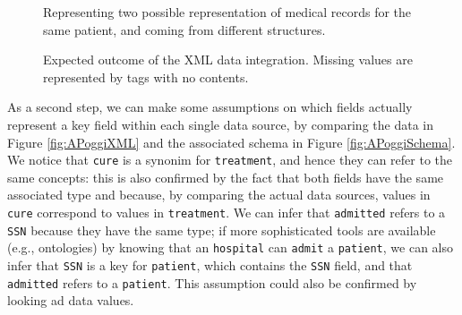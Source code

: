 \begin{figure}[!p]
	\begin{minipage}[t]{\textwidth}
		
		\label{fig:ManolescuXML}
	\end{minipage}
	
	\begin{minipage}[t]{\textwidth}
		
		\label{fig:APoggiXML}
	\end{minipage}
	
	\caption{Representing two possible representation of medical records for the same patient, and coming from different structures.}
	\label{fig:XMLIntegration}
\end{figure}
\begin{figure}[!p]
	
	\caption{Expected outcome of the XML data integration. Missing values are represented by tags with no contents.}
	\label{fig:XMLDataMergeAfterAlignment}
\end{figure}
As a second step, we can make some assumptions on which fields actually represent a key field within each single data source, by comparing the data in Figure \vref{fig:APoggiXML} and the associated schema in Figure \ref{fig:APoggiSchema}. We notice that \texttt{cure} is a synonim for \texttt{treatment}, and hence they can refer to the same concepts: this is also confirmed by the fact that both fields have the same associated   type and because, by comparing the actual data sources,  values in \texttt{cure} correspond to values in \texttt{treatment}. We can infer that \texttt{admitted} refers to a \texttt{SSN} because they have the same type; if more sophisticated tools are available (e.g., ontologies) by knowing that an \texttt{hospital} can \texttt{admit} a \texttt{patient},  we can also infer that \texttt{SSN} is a key for \texttt{patient}, which contains the \texttt{SSN} field, and that \texttt{admitted} refers to a \texttt{patient}. This assumption could also be confirmed by looking ad data values.





